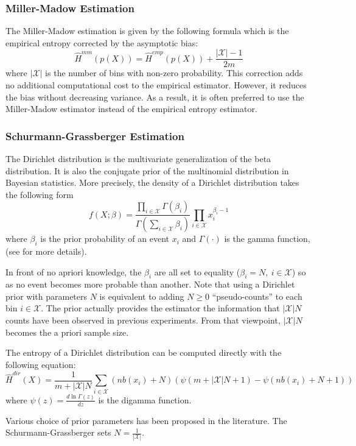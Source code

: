 \documentclass{article}
\begin{document}
\subsubsection{Miller-Madow Estimation}
The Miller-Madow estimation is given by the following formula which
is the empirical entropy corrected by the asymptotic bias:
$$\hat{H}^{mm}(p(X)) = \hat{H}^{emp}(p(X)) + \frac{|\mathcal{X}|-1}{2m} $$
where $|\mathcal{X}|$ is the number of bins with non-zero probability. This correction
adds no additional computational cost to the empirical estimator. However, it
reduces the bias without decreasing variance. As a result, it is often preferred
to use the Miller-Madow estimator instead of the empirical entropy estimator.

\subsubsection{Schurmann-Grassberger Estimation}
The Dirichlet distribution is the multivariate generalization of the
beta distribution. It is also the conjugate prior of the multinomial
distribution in Bayesian statistics. More precisely, the density of
a Dirichlet distribution takes the following form
$$f(X;\beta)=\frac{\prod_{i\in\mathcal{X}}\Gamma(\beta_{i})}{\Gamma(\sum_{i\in\mathcal{X}}\beta_{i})}\prod_{i\in\mathcal{X}}x_{i}^{\beta_{i}-1}$$
where $\beta_{i}$ is the prior probability of an event $x_{i}$ and
$\Gamma(\cdot)$ is the gamma function, (see \cite{hausser,nemenman}
for more details).

In front of no apriori knowledge, the $\beta_{i}$ are all set to
equality ($\beta_{i}=N,\ i\in\mathcal{X}$) so as no event becomes
more probable than another. Note that using a Dirichlet prior with
parameters $N$ is equivalent to adding $N\geq0$ \textquotedblleft{}pseudo-counts\textquotedblright{}
to each bin $i\in\mathcal{X}$. The prior actually provides the estimator
the information that $|\mathcal{X}|N$ counts have been observed in
previous experiments. From that viewpoint, $|\mathcal{X}|N$ becomes
the a priori sample size. 

The entropy of a Dirichlet distribution can be computed directly with the following equation:
$$\hat{H}^{dir}(X)=\frac{1}{m+|\mathcal{X}|N}\sum_{i\in\mathcal{X}}(nb(x_{i})+N)(\psi(m+|\mathcal{X}|N+1)-\psi(nb(x_{i})+N+1))$$
where $\psi(z)=\frac{d\ln\Gamma(z)}{dz}$ is the digamma function.

Various choice of prior parameters has been proposed in the literature. 
The Schurmann-Grassberger sets $N=\frac{1}{|\mathcal{X}|}$. 
\end{document}
